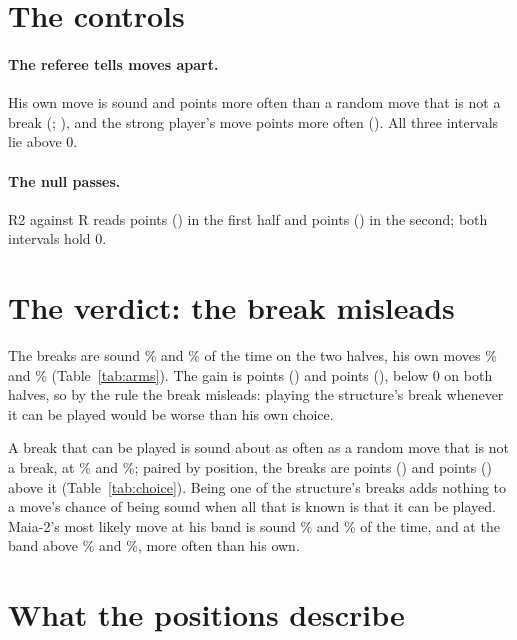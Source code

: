 \documentclass[11pt]{article}
\begin{document}
\section{The controls}

\paragraph{The referee tells moves apart.} His own move is sound \ControlFirst{} and
\ControlSecond{} points more often than a random move that is not a break (\ControlFirstCi;
\ControlSecondCi), and the strong player's move \StrongControl{} points more often
(\StrongControlCi). All three intervals lie above 0.

\paragraph{The null passes.} R2 against R reads \NullFirst{} points (\NullFirstCi) in the first
half and \NullSecond{} points (\NullSecondCi) in the second; both intervals hold 0.

\section{The verdict: the break misleads}

\ArmTable

The breaks are sound \BFirst\% and \BSecond\% of the time on the two halves, his own moves
\AFirst\% and \ASecond\% (Table~\ref{tab:arms}). The gain is \GainFirst{} points (\GainFirstCi)
and \GainSecond{} points (\GainSecondCi), below 0 on both halves, so by the rule the break
misleads: playing the structure's break whenever it can be played would be worse than his own
choice.

A break that can be played is sound about as often as a random move that is not a break, at
\RFirst\% and \RSecond\%; paired by position, the breaks are \BRFirst{} points (\BRFirstCi) and
\BRSecond{} points (\BRSecondCi) above it (Table~\ref{tab:choice}). Being one of the structure's
breaks adds nothing to a move's chance of being sound when all that is known is that it can be
played. Maia-2's most likely move at his band is sound \NFirst\% and \NSecond\% of the time, and
at the band above \UFirst\% and \USecond\%, more often than his own.

\section{What the positions describe}
\end{document}
